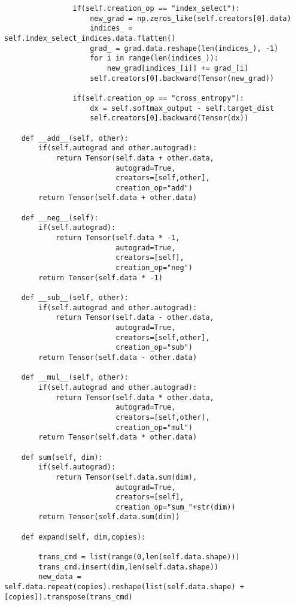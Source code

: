 \documentclass[12pt]{article}
\begin{document}
\begin{verbatim}
                if(self.creation_op == "index_select"):
                    new_grad = np.zeros_like(self.creators[0].data)
                    indices_ = self.index_select_indices.data.flatten()
                    grad_ = grad.data.reshape(len(indices_), -1)
                    for i in range(len(indices_)):
                        new_grad[indices_[i]] += grad_[i]
                    self.creators[0].backward(Tensor(new_grad))
                    
                if(self.creation_op == "cross_entropy"):
                    dx = self.softmax_output - self.target_dist
                    self.creators[0].backward(Tensor(dx))
                    
    def __add__(self, other):
        if(self.autograd and other.autograd):
            return Tensor(self.data + other.data,
                          autograd=True,
                          creators=[self,other],
                          creation_op="add")
        return Tensor(self.data + other.data)

    def __neg__(self):
        if(self.autograd):
            return Tensor(self.data * -1,
                          autograd=True,
                          creators=[self],
                          creation_op="neg")
        return Tensor(self.data * -1)
    
    def __sub__(self, other):
        if(self.autograd and other.autograd):
            return Tensor(self.data - other.data,
                          autograd=True,
                          creators=[self,other],
                          creation_op="sub")
        return Tensor(self.data - other.data)
    
    def __mul__(self, other):
        if(self.autograd and other.autograd):
            return Tensor(self.data * other.data,
                          autograd=True,
                          creators=[self,other],
                          creation_op="mul")
        return Tensor(self.data * other.data)    

    def sum(self, dim):
        if(self.autograd):
            return Tensor(self.data.sum(dim),
                          autograd=True,
                          creators=[self],
                          creation_op="sum_"+str(dim))
        return Tensor(self.data.sum(dim))
    
    def expand(self, dim,copies):

        trans_cmd = list(range(0,len(self.data.shape)))
        trans_cmd.insert(dim,len(self.data.shape))
        new_data = self.data.repeat(copies).reshape(list(self.data.shape) + [copies]).transpose(trans_cmd)
        

\end{verbatim}
\end{document}

